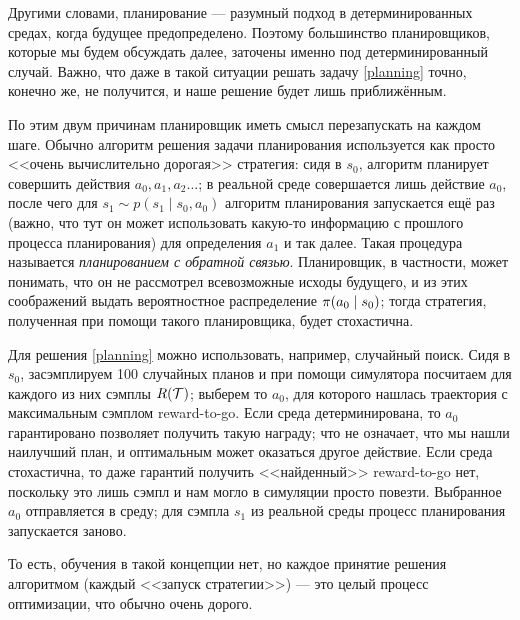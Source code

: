 Другими словами, планирование --- разумный подход в детерминированных средах, когда будущее предопределено. Поэтому большинство планировщиков, которые мы будем обсуждать далее, заточены именно под детерминированный случай. Важно, что даже в такой ситуации решать задачу \eqref{planning} точно, конечно же, не получится, и наше решение будет лишь приближённым. 

По этим двум причинам планировщик иметь смысл перезапускать на каждом шаге. Обычно алгоритм решения задачи планирования используется как просто <<очень вычислительно дорогая>> стратегия: сидя в $s_0$, алгоритм планирует совершить действия $a_0, a_1, a_2 \dots$; в реальной среде совершается лишь действие $a_0$, после чего для $s_1 \sim p(s_1 \mid s_0, a_0)$ алгоритм планирования запускается ещё раз (важно, что тут он может использовать какую-то информацию с прошлого процесса планирования) для определения $a_1$ и так далее. Такая процедура называется \emph{планированием с обратной связью}. Планировщик, в частности, может понимать, что он не рассмотрел всевозможные исходы будущего, и из этих соображений выдать вероятностное распределение $\pi(a_0 \HM\mid s_0)$; тогда стратегия, полученная при помощи такого планировщика, будет стохастична.

\begin{example}
Для решения \eqref{planning} можно использовать, например, случайный поиск. Сидя в $s_0$, засэмплируем 100 случайных планов и при помощи симулятора посчитаем для каждого из них сэмплы $R(\mathcal{T})$; выберем то $a_0$, для которого нашлась траектория с максимальным сэмплом reward-to-go. Если среда детерминирована, то $a_0$ гарантировано позволяет получить такую награду; что не означает, что мы нашли наилучший план, и оптимальным может оказаться другое действие. Если среда стохастична, то даже гарантий получить <<найденный>> reward-to-go нет, поскольку это лишь сэмпл и нам могло в симуляции просто повезти. Выбранное $a_0$ отправляется в среду; для сэмпла $s_1$ из реальной среды процесс планирования запускается заново. 


\end{example}

То есть, обучения в такой концепции нет, но каждое принятие решения алгоритмом (каждый <<запуск стратегии>>) --- это целый процесс оптимизации, что обычно очень дорого.

